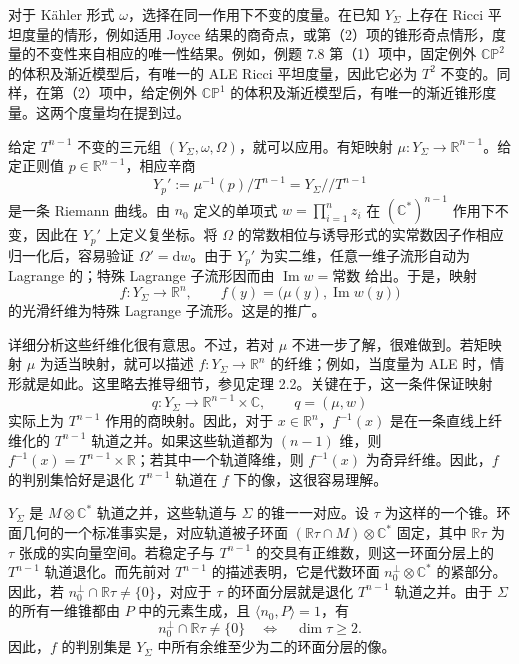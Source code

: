 对于 Kähler 形式 $\omega$，选择在同一作用下不变的度量。在已知 $Y_\Sigma$ 上存在 Ricci 平坦度量的情形，例如适用 Joyce 结果的商奇点，或第（2）项的锥形奇点情形，度量的不变性来自相应的唯一性结果。例如，例题 7.8 第（1）项中，固定例外 $\mathbb{CP}^2$ 的体积及渐近模型后，有唯一的 ALE Ricci 平坦度量，因此它必为 $T^2$ 不变的。同样，在第（2）项中，给定例外 $\mathbb{CP}^1$ 的体积及渐近模型后，有唯一的渐近锥形度量。这两个度量均在提到过。

给定 $T^{n-1}$ 不变的三元组 $(Y_\Sigma,\omega,\Omega)$，就可以应用。有矩映射 $\mu\colon Y_\Sigma\to\mathbb R^{n-1}$。给定正则值 $p\in\mathbb R^{n-1}$，相应辛商
\[
Y_p':=\mu^{-1}(p)/T^{n-1}=Y_\Sigma/\!/T^{n-1}
\]
是一条 Riemann 曲线。由 $n_0$ 定义的单项式 $w=\prod_{i=1}^nz_i$ 在 $(\mathbb C^*)^{n-1}$ 作用下不变，因此在 $Y_p'$ 上定义复坐标。将 $\Omega$ 的常数相位与诱导形式的实常数因子作相应归一化后，容易验证 $\Omega'=\mathrm dw$。由于 $Y_p'$ 为实二维，任意一维子流形自动为 Lagrange 的；特殊 Lagrange 子流形因而由 $\operatorname{Im}w=\text{常数}$ 给出。于是，映射
\[
f\colon Y_\Sigma\longrightarrow\mathbb R^n,
\qquad f(y)=\bigl(\mu(y),\operatorname{Im}w(y)\bigr)
\]
的光滑纤维为特殊 Lagrange 子流形。这是的推广。

详细分析这些纤维化很有意思。不过，若对 $\mu$ 不进一步了解，很难做到。若矩映射 $\mu$ 为适当映射，就可以描述 $f\colon Y_\Sigma\to\mathbb R^n$ 的纤维；例如，当度量为 ALE 时，情形就是如此。这里略去推导细节，参见定理 2.2。关键在于，这一条件保证映射
\[
q\colon Y_\Sigma\longrightarrow\mathbb R^{n-1}\times\mathbb C,
\qquad q=(\mu,w)
\]
实际上为 $T^{n-1}$ 作用的商映射。因此，对于 $x\in\mathbb R^n$，$f^{-1}(x)$ 是在一条直线上纤维化的 $T^{n-1}$ 轨道之并。如果这些轨道都为 $(n-1)$ 维，则 $f^{-1}(x)=T^{n-1}\times\mathbb R$；若其中一个轨道降维，则 $f^{-1}(x)$ 为奇异纤维。因此，$f$ 的判别集恰好是退化 $T^{n-1}$ 轨道在 $f$ 下的像，这很容易理解。

$Y_\Sigma$ 是 $M\otimes\mathbb C^*$ 轨道之并，这些轨道与 $\Sigma$ 的锥一一对应。设 $\tau$ 为这样的一个锥。环面几何的一个标准事实是，对应轨道被子环面 $(\mathbb R\tau\cap M)\otimes\mathbb C^*$ 固定，其中 $\mathbb R\tau$ 为 $\tau$ 张成的实向量空间。若稳定子与 $T^{n-1}$ 的交具有正维数，则这一环面分层上的 $T^{n-1}$ 轨道退化。而先前对 $T^{n-1}$ 的描述表明，它是代数环面 $n_0^\perp\otimes\mathbb C^*$ 的紧部分。因此，若 $n_0^\perp\cap\mathbb R\tau\neq\{0\}$，对应于 $\tau$ 的环面分层就是退化 $T^{n-1}$ 轨道之并。由于 $\Sigma$ 的所有一维锥都由 $P$ 中的元素生成，且 $\langle n_0,P\rangle=1$，有
\[
n_0^\perp\cap\mathbb R\tau\neq\{0\}
\quad\Longleftrightarrow\quad\dim\tau\geq2.
\]
因此，$f$ 的判别集是 $Y_\Sigma$ 中所有余维至少为二的环面分层的像。

